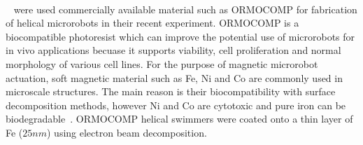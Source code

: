 \documentclass[12pt,a4paper,titlepage]{report}
\newcommand{\head}[1]{\textnormal{\textbf{#1}}}
\begin{document}
\paragraph{}
 \citeauthor{qiu2014noncytotoxic}~\citep{qiu2014noncytotoxic} were used commercially available material such as ORMOCOMP
 for fabrication of helical microrobots in their recent experiment. ORMOCOMP is a biocompatible photoresist which
can improve the potential use of microrobots for in vivo applications becuase it supports viability, cell proliferation
 and normal morphology of various cell lines. For the purpose of magnetic microrobot actuation, soft magnetic material
such as Fe, Ni and Co are commonly used in microscale structures. The main reason is their biocompatibility
with surface decomposition methods, however Ni and Co are cytotoxic and pure iron can be biodegradable~\citep{qiu2014noncytotoxic}.
ORMOCOMP helical swimmers were coated onto a thin layer of Fe ($25 nm$) using electron beam decomposition.
  

\end{document}
